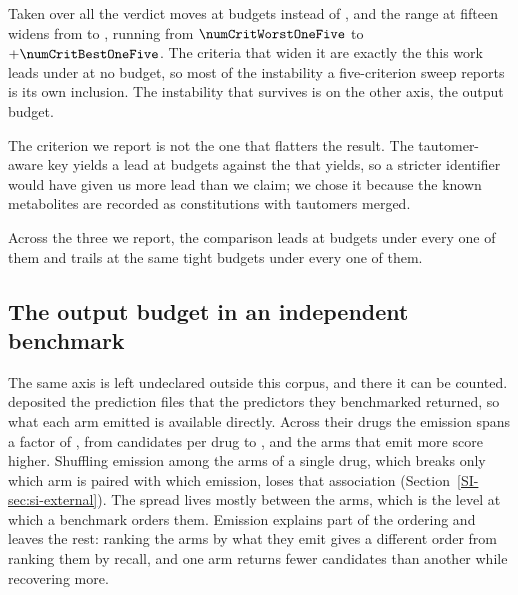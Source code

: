 Taken over all \numCritCriteriaWord{} the verdict moves at \numCritMovedMaxWord{} budgets instead
of \numCritDefensibleMovedWord{}, and the range at fifteen widens from
\numCritDefensibleSwingOneFive{} to \numCritSwingOneFive{}, running from $\numCritWorstOneFive$ to
$+\numCritBestOneFive$. The \numCritLeadsUnderNoIndefensibleWord{} criteria that widen it are
exactly the \numCritLeadsUnderNoIndefensibleWord{} this work leads under at no budget, so most of
the instability a five-criterion sweep reports is its own inclusion. The instability that survives
is on the other axis, the output budget.

The criterion we report is not the one that flatters the result. The tautomer-aware key yields a
lead at \numCritLeadsDefaultWord{} budgets against the \numCritLeadsBestWord{} that
\numCritLeadsbestname{} yields, so a stricter identifier would have given us
\numCritLeadsBestMinusDefaultWord{} more lead than we claim; we chose it because the known metabolites are recorded as constitutions with tautomers merged.

Across the three we report, the comparison leads at
\numCritLeadsUnderEveryDefensibleWord{} budgets under every one of them and trails at the same
\numCritTrailsUnderAnyDefensibleWord{} tight budgets under every one of them.

\subsection{The output budget in an independent benchmark}
\label{sec:external}

The same axis is left undeclared outside this corpus, and there it can be counted. \citet{Gao_2026} deposited the prediction files that the \numExtbudgetArmsWord{}
predictors they benchmarked returned, so what each arm emitted is available directly. Across their
\numExtbudgetDrugs{} drugs the emission spans a factor of \numExtbudgetRatio{}, from
\numExtbudgetNarrowest{} candidates per drug to \numExtbudgetWidest{}, and the arms that emit more
score higher. Shuffling emission among the arms of a single drug, which breaks only which arm is
paired with which emission, loses that association (Section~\ref{SI-sec:si-external}). The spread lives mostly between the arms, which is the level
at which a benchmark orders them. Emission explains part of the ordering and leaves the rest:
ranking the arms by what they emit gives a different order from ranking them by recall, and one
arm returns fewer candidates than another while recovering more.

